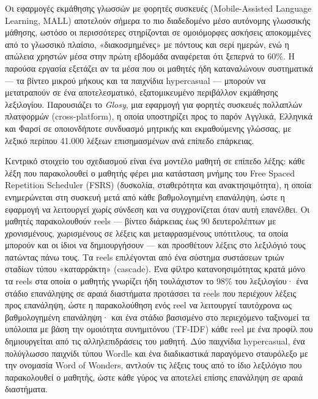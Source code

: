 
Οι εφαρμογές εκμάθησης γλωσσών με φορητές συσκευές (Mobile-Assisted Language Learning, MALL) αποτελούν σήμερα το πιο διαδεδομένο μέσο αυτόνομης γλωσσικής μάθησης, ωστόσο οι περισσότερες στηρίζονται σε ομοιόμορφες ασκήσεις αποκομμένες από το γλωσσικό πλαίσιο, «διακοσμημένες» με πόντους και σερί ημερών, ενώ η απώλεια χρηστών μέσα στην πρώτη εβδομάδα αναφέρεται ότι ξεπερνά το 60\%. Η παρούσα εργασία εξετάζει αν τα μέσα που οι μαθητές ήδη καταναλώνουν συστηματικά --- τα βίντεο μικρού μήκους και τα παιχνίδια hypercasual --- μπορούν να μετατραπούν σε ένα αποτελεσματικό, εξατομικευμένο περιβάλλον εκμάθησης λεξιλογίου. Παρουσιάζει το \textit{Glosy}, μια εφαρμογή για φορητές συσκευές πολλαπλών πλατφορμών (cross-platform), η οποία υποστηρίζει προς το παρόν Αγγλικά, Ελληνικά και Φαρσί σε οποιονδήποτε συνδυασμό μητρικής και εκμαθούμενης γλώσσας, με λεξικό περίπου 41.000 λέξεων επισημασμένων ανά επίπεδο επάρκειας.

Κεντρικό στοιχείο του σχεδιασμού είναι ένα μοντέλο μαθητή σε επίπεδο λέξης: κάθε λέξη που παρακολουθεί ο μαθητής φέρει μια κατάσταση μνήμης του Free Spaced Repetition Scheduler (FSRS) (δυσκολία, σταθερότητα και ανακτησιμότητα), η οποία ενημερώνεται στη συσκευή μετά από κάθε βαθμολογημένη επανάληψη, ώστε η εφαρμογή να λειτουργεί χωρίς σύνδεση και να συγχρονίζεται όταν αυτή επανέλθει. Οι μαθητές παρακολουθούν reels --- βίντεο διάρκειας έως 90 δευτερολέπτων με χρονισμένους, χωρισμένους σε λέξεις και μεταφρασμένους υπότιτλους, τα οποία μπορούν και οι ίδιοι να δημιουργήσουν --- και προσθέτουν λέξεις στο λεξιλόγιό τους πατώντας πάνω τους. Τα reels επιλέγονται από ένα σύστημα συστάσεων τριών σταδίων τύπου «καταρράκτη» (cascade). Ένα φίλτρο κατανοησιμότητας κρατά μόνο τα reels στα οποία ο μαθητής γνωρίζει ήδη τουλάχιστον το 98\% του λεξιλογίου· ένα στάδιο επανάληψης σε αραιά διαστήματα προτάσσει τα reels που περιέχουν λέξεις προς επανάληψη, ώστε η παρακολούθηση ενός reel να λειτουργεί ταυτόχρονα ως βαθμολογημένη επανάληψη· και ένα στάδιο βασισμένο στο περιεχόμενο ταξινομεί τα υπόλοιπα με βάση την ομοιότητα συνημιτόνου (TF-IDF) κάθε reel με ένα προφίλ που δημιουργείται από τις αλληλεπιδράσεις του μαθητή. Δύο παιχνίδια hypercasual, ένα πολύγλωσσο παιχνίδι τύπου Wordle και ένα διαδικαστικά παραγόμενο σταυρόλεξο με την ονομασία Word of Wonders, αντλούν τις λέξεις τους από το ίδιο λεξιλόγιο που παρακολουθεί ο μαθητής, ώστε κάθε γύρος να αποτελεί επίσης επανάληψη σε αραιά διαστήματα.

